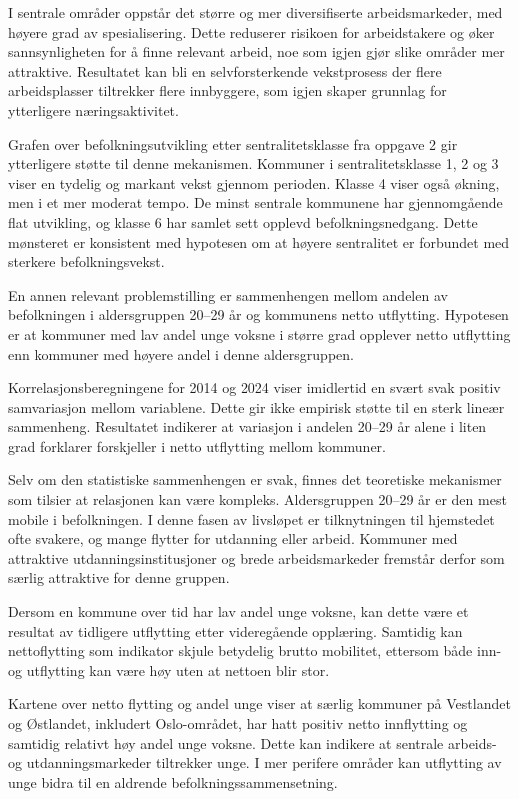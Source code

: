 \documentclass[
  norsk,
  letterpaper,
  DIV=11,
  numbers=noendperiod]{scrartcl}
\begin{document}
I sentrale områder oppstår det større og mer diversifiserte
arbeidsmarkeder, med høyere grad av spesialisering. Dette reduserer
risikoen for arbeidstakere og øker sannsynligheten for å finne relevant
arbeid, noe som igjen gjør slike områder mer attraktive. Resultatet kan
bli en selvforsterkende vekstprosess der flere arbeidsplasser tiltrekker
flere innbyggere, som igjen skaper grunnlag for ytterligere
næringsaktivitet.

Grafen over befolkningsutvikling etter sentralitetsklasse fra oppgave 2
gir ytterligere støtte til denne mekanismen. Kommuner i
sentralitetsklasse 1, 2 og 3 viser en tydelig og markant vekst gjennom
perioden. Klasse 4 viser også økning, men i et mer moderat tempo. De
minst sentrale kommunene har gjennomgående flat utvikling, og klasse 6
har samlet sett opplevd befolkningsnedgang. Dette mønsteret er
konsistent med hypotesen om at høyere sentralitet er forbundet med
sterkere befolkningsvekst.

En annen relevant problemstilling er sammenhengen mellom andelen av
befolkningen i aldersgruppen 20--29 år og kommunens netto utflytting.
Hypotesen er at kommuner med lav andel unge voksne i større grad
opplever netto utflytting enn kommuner med høyere andel i denne
aldersgruppen.

Korrelasjonsberegningene for 2014 og 2024 viser imidlertid en svært svak
positiv samvariasjon mellom variablene. Dette gir ikke empirisk støtte
til en sterk lineær sammenheng. Resultatet indikerer at variasjon i
andelen 20--29 år alene i liten grad forklarer forskjeller i netto
utflytting mellom kommuner.

Selv om den statistiske sammenhengen er svak, finnes det teoretiske
mekanismer som tilsier at relasjonen kan være kompleks. Aldersgruppen
20--29 år er den mest mobile i befolkningen. I denne fasen av livsløpet
er tilknytningen til hjemstedet ofte svakere, og mange flytter for
utdanning eller arbeid. Kommuner med attraktive utdanningsinstitusjoner
og brede arbeidsmarkeder fremstår derfor som særlig attraktive for denne
gruppen.

Dersom en kommune over tid har lav andel unge voksne, kan dette være et
resultat av tidligere utflytting etter videregående opplæring. Samtidig
kan nettoflytting som indikator skjule betydelig brutto mobilitet,
ettersom både inn- og utflytting kan være høy uten at nettoen blir stor.

Kartene over netto flytting og andel unge viser at særlig kommuner på
Vestlandet og Østlandet, inkludert Oslo-området, har hatt positiv netto
innflytting og samtidig relativt høy andel unge voksne. Dette kan
indikere at sentrale arbeids- og utdanningsmarkeder tiltrekker unge. I
mer perifere områder kan utflytting av unge bidra til en aldrende
befolkningssammensetning.
\end{document}

